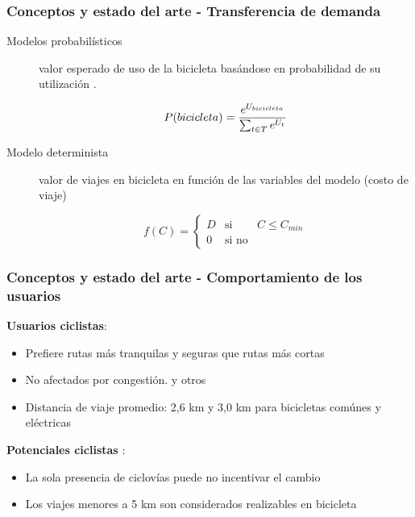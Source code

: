 \documentclass[aspectratio=43, 10pt]{beamer}
\begin{document}
\begin{frame}
    \frametitle{Conceptos y estado del arte - Transferencia de demanda}


    \begin{description}
        \item[Modelos probabilísticos] {
            valor esperado de uso de la bicicleta basándose en probabilidad de su utilización
            \parencite{ortuz2011, Liu2019, Pacheco2021}.

            \begin{equation*}
                P(bicicleta) = {e^{U_{bicicleta}} \over \sum_{t \in T} e^{U_t}}
            \end{equation*}
        }
        \item[Modelo determinista] {
            valor de viajes en bicicleta en función de las variables del modelo (costo de viaje)
            \parencite{marin2007, laporte2007}

            \begin{equation*}
                f(C) = \left\{ \begin{array}{lcr}
                D & \text{si}   & C \leq C_{min} \\
                  0 & \text{si no} &
            \end{array}
            \right.
            \end{equation*}
        }
    \end{description}
\end{frame}


\begin{frame}
    \frametitle{Conceptos y estado del arte - Comportamiento de los usuarios}

    \textbf{Usuarios ciclistas}:

    \begin{itemize}
        \item{Prefiere rutas más tranquilas y seguras que rutas más cortas \parencite{winters2010}}
        \item{No afectados por congestión. \parencite{Lin2013, Duthie2014} y otros}
        \item{Distancia de viaje promedio: 2,6 km y 3,0 km para bicicletas comúnes y eléctricas \parencite{anette2018}}
    \end{itemize}

    \textbf{Potenciales ciclistas} \parencite{shwe2014}:

    \begin{itemize}
        \item{La sola presencia de ciclovías puede no incentivar el cambio}
        \item{Los viajes menores a 5 km son considerados realizables en bicicleta}
    \end{itemize}
\end{frame}
\end{document}
